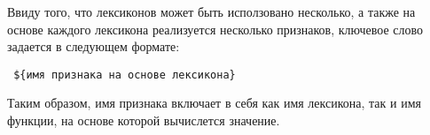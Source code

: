     \lstset{style=python}
    

    \lstset{style=python}
    

    \lstset{style=python}
    

    Ввиду того, что лексиконов может быть исползовано несколько, а также на основе
    каждого лексикона реализуется несколько признаков, ключевое слово
    задается в следующем формате:
    \begin{center}
        \tt
        \$\{имя признака на основе лексикона\}
    \end{center}

    Таким образом, имя признака включает в себя как имя лексикона, так и имя
    функции, на основе которой вычислется значение.
